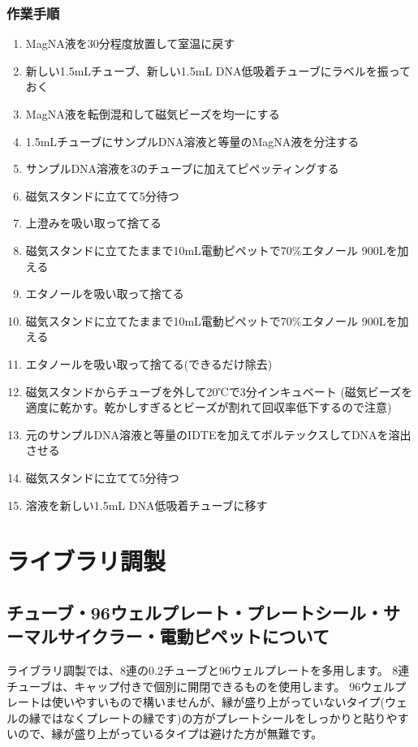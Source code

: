 \documentclass[titlepage,10pt,a4paper,uplatex]{jsbook}
\begin{document}
\subsubsection{作業手順}
\begin{enumerate}
\item MagNA液を30分程度放置して室温に戻す
\item 新しい1.5mLチューブ、新しい1.5mL DNA低吸着チューブにラベルを振っておく
\item MagNA液を転倒混和して磁気ビーズを均一にする
\item 1.5mLチューブにサンプルDNA溶液と等量のMagNA液を分注する
\item サンプルDNA溶液を3のチューブに加えてピペッティングする
\item 磁気スタンドに立てて5分待つ
\item 上澄みを吸い取って捨てる
\item 磁気スタンドに立てたままで10mL電動ピペットで70\%エタノール 900{\textmu}Lを加える
\item エタノールを吸い取って捨てる
\item 磁気スタンドに立てたままで10mL電動ピペットで70\%エタノール 900{\textmu}Lを加える
\item エタノールを吸い取って捨てる(できるだけ除去)
\item 磁気スタンドからチューブを外して20℃で3分インキュベート (磁気ビーズを適度に乾かす。乾かしすぎるとビーズが割れて回収率低下するので注意)
\item 元のサンプルDNA溶液と等量のIDTEを加えてボルテックスしてDNAを溶出させる
\item 磁気スタンドに立てて5分待つ
\item 溶液を新しい1.5mL DNA低吸着チューブに移す
\end{enumerate}

\section{ライブラリ調製}

\subsection{チューブ・96ウェルプレート・プレートシール・サーマルサイクラー・電動ピペットについて}

ライブラリ調製では、8連の0.2チューブと96ウェルプレートを多用します。
8連チューブは、キャップ付きで個別に開閉できるものを使用します。
96ウェルプレートは使いやすいもので構いませんが、縁が盛り上がっていないタイプ(ウェルの縁ではなくプレートの縁です)の方がプレートシールをしっかりと貼りやすいので、縁が盛り上がっているタイプは避けた方が無難です。
\end{document}
